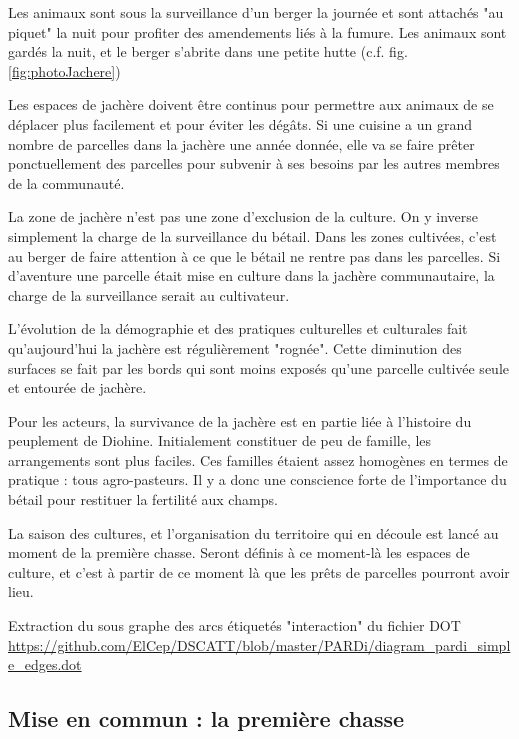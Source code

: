 Les animaux sont  sous la surveillance d'un berger la journée et sont attachés "au piquet" la nuit pour profiter des amendements liés à la fumure. Les animaux sont gardés la nuit, et le berger s'abrite dans une petite hutte (c.f. fig. \ref{fig:photoJachere})

Les espaces de jachère doivent être continus pour permettre aux animaux de se déplacer plus facilement et pour éviter les dégâts. Si une cuisine a un grand nombre de parcelles dans la jachère une année donnée, elle va se faire prêter ponctuellement des parcelles pour subvenir à ses besoins par les autres membres de la communauté.

La zone de jachère n'est pas une zone d'exclusion de la culture. On y inverse simplement la charge de la surveillance du bétail. Dans les zones cultivées, c'est au berger de faire attention à ce que le bétail ne rentre pas dans les parcelles. Si d'aventure une parcelle était mise en culture dans la jachère communautaire, la charge de la surveillance serait au cultivateur.

L'évolution de la démographie et des pratiques culturelles et culturales fait qu'aujourd'hui la jachère est régulièrement "rognée". Cette diminution des surfaces se fait par les bords qui sont moins exposés qu'une parcelle cultivée seule et entourée de jachère.

Pour les acteurs, la survivance de la jachère est en partie liée à l'histoire du peuplement de Diohine. Initialement constituer de peu de famille, les arrangements sont plus faciles. Ces familles étaient assez homogènes en termes de pratique : tous agro-pasteurs. Il y a donc une conscience forte de l'importance du bétail pour restituer la fertilité aux champs.

La saison des cultures, et l'organisation du territoire qui en découle est lancé au moment de la première chasse. Seront définis à ce moment-là les espaces de culture, et c'est à partir de ce moment là que les prêts de parcelles pourront avoir lieu.

Extraction du sous graphe des arcs étiquetés  "interaction" du fichier DOT \url{https://github.com/ElCep/DSCATT/blob/master/PARDi/diagram_pardi_simple_edges.dot}

 \subsection{Mise en commun : la première chasse}\label{sec:premierchasse}



